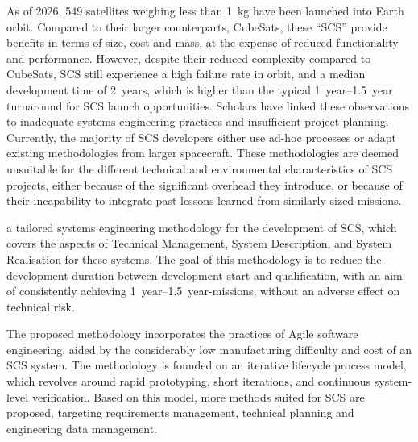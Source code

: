 \documentclass[a4paper,nobib,justified,final]{tufte-book}
\begin{document}
\begin{fullwidth}
	As of 2026, 549 satellites weighing less than \SI{1}{\kilogram} have been launched into Earth orbit.
	Compared to their larger counterparts, CubeSats, these ``\acf{SCS}'' provide benefits in terms of size, cost and mass, at the expense of reduced functionality and performance.
	However, despite their reduced complexity compared to CubeSats, \acl{SCS} still experience a high failure rate in orbit, and a median development time of \qty{2}{years}, which is higher than the typical \qtyrange[range-units = single]{1}{1.5}{year} turnaround for \acs{SCS} launch opportunities.
	Scholars have linked these observations to inadequate systems engineering practices and insufficient project planning.
	Currently, the majority of \acs{SCS} developers either use ad-hoc processes or adapt existing methodologies from larger spacecraft.
	These methodologies are deemed unsuitable for the different technical and environmental characteristics of \acs{SCS} projects, either because of the significant overhead they introduce, or because of their incapability to integrate past lessons learned from similarly-sized missions.

	\vspace{-1cm}
	 a tailored systems engineering methodology for the development of \acl{SCS}, which covers the aspects of Technical Management, System Description, and System Realisation for these systems. The goal of this methodology is to reduce the development duration between development start and qualification, with an aim of consistently achieving \qtyrange[range-units = single]{1}{1.5}{year}-missions, without an adverse effect on technical risk.

	The proposed methodology incorporates the practices of Agile software engineering, aided by the considerably low manufacturing difficulty and cost of an \acs{SCS} system. The methodology is founded on an iterative lifecycle process model, which revolves around rapid prototyping, short iterations, and continuous system-level verification. Based on this model, more methods suited for \acs{SCS} are proposed, targeting requirements management, technical planning and engineering data management.


\end{fullwidth}
\end{document}

